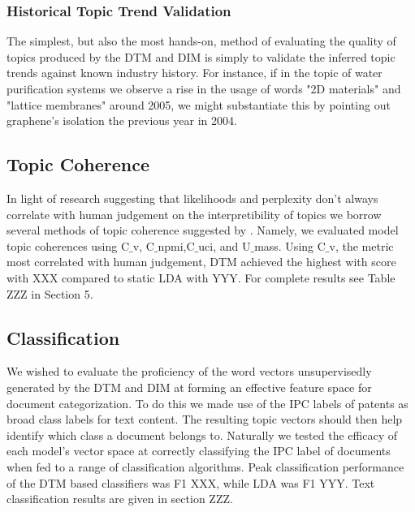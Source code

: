 \subsubsection{Historical Topic Trend Validation}
The simplest, but also the most hands-on, method of evaluating the quality of topics produced by the DTM and DIM is simply to validate the inferred topic trends against known industry history. For instance, if in the topic of water purification systems we observe a rise in the usage of words "2D materials" and "lattice membranes" around 2005, we might substantiate this by pointing out graphene's isolation the previous year in 2004.
 

\subsection{Topic Coherence}
In light of research suggesting that likelihoods and perplexity don't always correlate with human judgement on the interpretibility of topics \parencite{Blei:2006:DTM:1143844.1143859} we borrow several methods of topic coherence suggested by \parencite{DBLP:journals/corr/RosnerHRNB14}. Namely, we evaluated model topic coherences using C$\_$v, C$\_$npmi,C$\_$uci, and U$\_$mass. Using C$\_$v, the metric most correlated with human judgement, DTM achieved the highest with score with XXX compared to static LDA with YYY. For complete results see Table ZZZ in Section 5.


\subsection{Classification}
We wished to evaluate the proficiency of the word vectors unsupervisedly generated by the DTM and DIM at forming an effective feature space for document categorization. To do this we made use of the IPC labels of patents as broad class labels for text content. The resulting topic vectors should then help identify which class a document belongs to. Naturally we tested the efficacy of each model's vector space at correctly classifying the IPC label of documents when fed to a range of classification algorithms. Peak classification performance of the DTM based classifiers was F1 XXX, while LDA was F1 YYY. Text classification results are given in section ZZZ.


